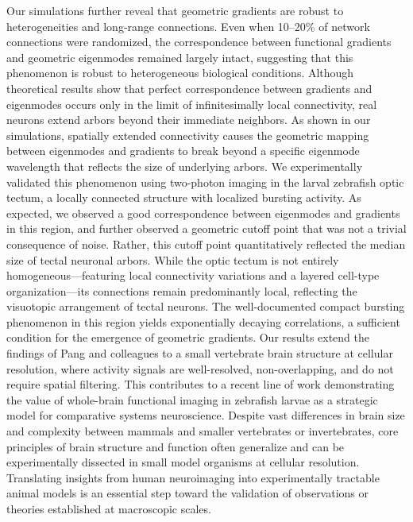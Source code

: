 \documentclass{article}
\begin{document}
Our simulations further reveal that geometric gradients are robust to heterogeneities and long-range connections. Even when 10–20\% of network connections were randomized, the correspondence between functional gradients and geometric eigenmodes remained largely intact, suggesting that this phenomenon is robust to heterogeneous biological conditions. Although theoretical results show that perfect correspondence between gradients and eigenmodes occurs only in the limit of infinitesimally local connectivity\cite{GarcaTrillos2019}, real neurons extend arbors beyond their immediate neighbors. As shown in our simulations, spatially extended connectivity causes the geometric mapping between eigenmodes and gradients to break beyond a specific eigenmode wavelength that reflects the size of underlying arbors. We experimentally validated this phenomenon using two-photon imaging in the larval zebrafish optic tectum, a locally connected structure with localized bursting activity\cite{avitan2017spontaneous}. As expected, we observed a good correspondence between eigenmodes and gradients in this region, and further observed a geometric cutoff point that was not a trivial consequence of noise. Rather, this cutoff point quantitatively reflected the median size of tectal neuronal arbors. While the optic tectum is not entirely homogeneous---featuring local connectivity variations and a layered cell-type organization\cite{helmbrecht2018topography, shainer2025transcriptomic}---its connections remain predominantly local, reflecting the visuotopic arrangement of tectal neurons\cite{niell2005functional, li2022topographic}. The well-documented compact bursting phenomenon in this region yields exponentially decaying correlations\cite{zylbertal2023recurrent}, a sufficient condition for the emergence of geometric gradients. Our results extend the findings of Pang and colleagues\cite{pang2023geometric} to a small vertebrate brain structure at cellular resolution, where activity signals are well-resolved, non-overlapping, and do not require spatial filtering. This contributes to a recent line of work demonstrating the value of whole-brain functional imaging in zebrafish larvae as a strategic model for comparative systems neuroscience\cite{legare2025structural}. Despite vast differences in brain size and complexity between mammals and smaller vertebrates or invertebrates, core principles of brain structure and function often generalize and can be experimentally dissected in small model organisms at cellular resolution\cite{ahrens2013whole, lin2022imaging}. Translating insights from human neuroimaging into experimentally tractable animal models is an essential step toward the validation of observations or theories established at macroscopic scales.
\end{document}
